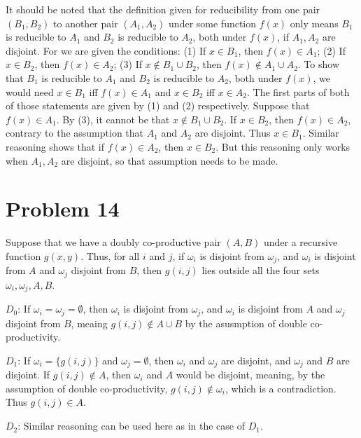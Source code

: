 \documentclass{article}
\theoremstyle{definition}
\begin{document}
It should be noted that the definition given for reducibility from one pair $(B_1,B_2)$ to another pair $(A_1,A_2)$ under some function $f(x)$ 
only means $B_1$ is reducible to $A_1$ and $B_2$ is reducible to $A_2$, both under $f(x)$, if 
$A_1,A_2$ are disjoint. For we are given the conditions:\newline
(1) If $x\in B_1$, then $f(x)\in A_1$;\newline
(2) If $x\in B_2$, then $f(x)\in A_2$;\newline
(3) If $x\notin B_1\cup B_2$, then $f(x)\notin A_1\cup A_2$.\newline
To show that $B_1$ is reducible to $A_1$ and $B_2$ is reducible to $A_2$, both under $f(x)$, we would need $x\in B_1$ iff $f(x)\in A_1$ and $x\in B_2$ iff $x\in A_2$. The first parts of both 
of those statements are given by (1) and (2) respectively. Suppose that $f(x)\in A_1$. By (3), it cannot be that $x\notin B_1\cup B_2$. If $x\in B_2$, then $f(x)\in A_2$, contrary to the 
assumption that $A_1$ and $A_2$ are disjoint. Thus $x\in B_1$.
Similar reasoning shows that if $f(x)\in A_2$, then $x\in B_2$. But this reasoning only works when $A_1,A_2$ are disjoint, so that assumption needs 
to be made. 

\section*{Problem 14}
Suppose that we have a doubly co-productive pair $(A,B)$ under a recursive function $g(x,y)$. Thus, for all $i$ and $j$, if $\omega_i$ is disjoint from $\omega_j$, and $\omega_i$ is disjoint 
from $A$ and $\omega_j$ disjoint from $B$, then $g(i,j)$ lies outside all the four sets $\omega_i,\omega_j,A,B$.


$D_0$: If $\omega_i=\omega_j=\emptyset$, then $\omega_i$ is disjoint from $\omega_j$, and $\omega_i$ is disjoint 
from $A$ and $\omega_j$ disjoint from $B$, meaing $g(i,j)\notin A\cup B$ by the asusmption of double co-productivity.


$D_1$: If $\omega_i=\{g(i,j)\}$ and $\omega_j=\emptyset$, then $\omega_i$ and $\omega_j$ are disjoint, and $\omega_j$ and $B$ are disjoint. If $g(i,j)\notin A$, then 
$\omega_i$ and $A$ would be disjoint, meaning, by the assumption of double co-productivity, $g(i,j)\notin\omega_i$, which is a contradiction. Thus $g(i,j)\in A$.


$D_2$: Similar reasoning can be used here as in the case of $D_1$. 
\end{document}
